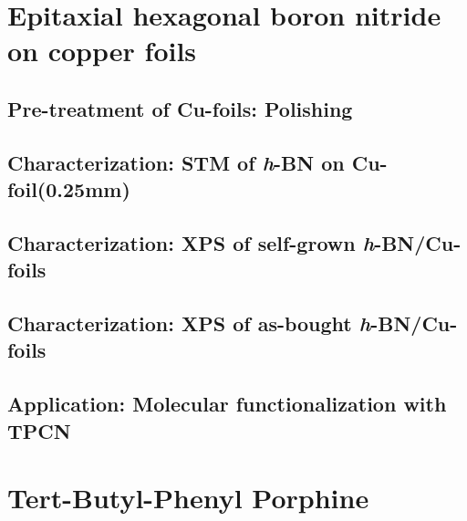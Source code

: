 \documentclass[
10pt,					%
a4paper,				%
twoside,				%
BCOR=8mm,				%
headings=normal,		%
headsepline,			%
footsepline,			%
plainfootsepline,		%
]{scrbook}
\begin{document}
\chapter{Epitaxial hexagonal boron nitride on copper foils}
  
\section{Pre-treatment of Cu-foils: Polishing}
  	
  \section{Characterization: STM of \textit{h}-BN on Cu-foil(0.25mm)}
     
  \section{Characterization: XPS of self-grown \textit{h}-BN/Cu-foils}
     
  \section{Characterization: XPS of as-bought \textit{h}-BN/Cu-foils}
     
  \section{Application: Molecular functionalization with TPCN}
     
\chapter{Tert-Butyl-Phenyl Porphine}
    
\end{document}

